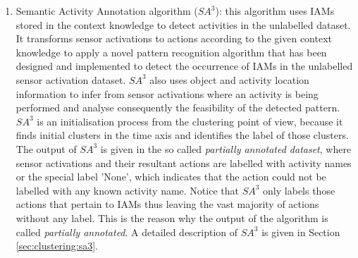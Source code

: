 \begin{enumerate}
 \item Semantic Activity Annotation algorithm ($SA^3$): this algorithm uses IAMs stored in the context knowledge to detect activities in the unlabelled dataset. It transforms sensor activations to actions according to the given context knowledge to apply a novel pattern recognition algorithm that has been designed and implemented to detect the occurrence of IAMs in the unlabelled sensor activation dataset. $SA^3$ also uses object and activity location information to infer from sensor activations where an activity is being performed and analyse consequently the feasibility of the detected pattern. $SA^3$ is an initialisation process from the clustering point of view, because it finds initial clusters in the time axis and identifies the label of those clusters. The output of $SA^3$ is given in the so called \textit{partially annotated dataset}, where sensor activations and their resultant actions are labelled with activity names or the special label 'None', which indicates that the action could not be labelled with any known activity name. Notice that $SA^3$ only labels those actions that pertain to IAMs thus leaving the vast majority of actions without any label. This is the reason why the output of the algorithm is called \textit{partially annotated}. A detailed description of $SA^3$ is given in Section \ref{sec:clustering:sa3}.

\end{enumerate}
